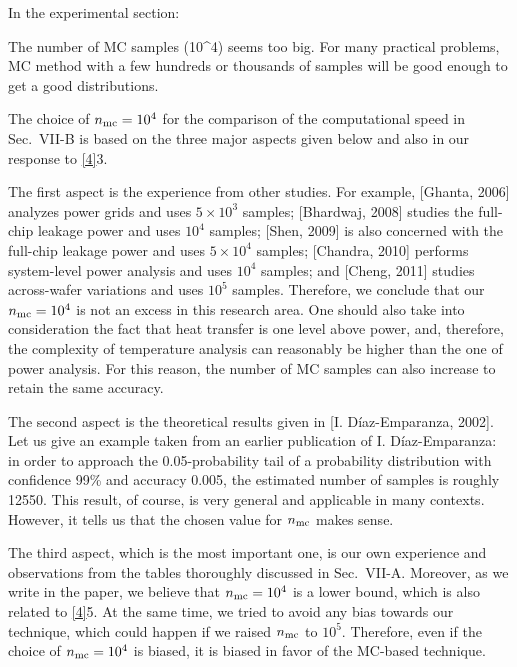 \begin{reviewer}
In the experimental section:

The number of MC samples (10\^{}4) seems too big. For many practical problems, MC method with a few hundreds or thousands of samples will be good enough to get a good distributions.
\end{reviewer}
\begin{authors}
The choice of ${n_\text{mc}} = 10^4$ for the comparison of the computational speed in Sec.~VII-B is based on the three major aspects given below and also in our response to \cref{4}{3}.

The first aspect is the experience from other studies.
For example, [Ghanta, 2006] analyzes power grids and uses $5 \times 10^3$ samples; [Bhardwaj, 2008] studies the full-chip leakage power and uses $10^4$ samples; [Shen, 2009] is also concerned with the full-chip leakage power and uses $5 \times 10^4$ samples; [Chandra, 2010] performs system-level power analysis and uses $10^4$ samples; and [Cheng, 2011] studies across-wafer variations and uses $10^5$ samples.
Therefore, we conclude that our ${n_\text{mc}} = 10^4$ is not an excess in this research area.
One should also take into consideration the fact that heat transfer is one level above power, and, therefore, the complexity of temperature analysis can reasonably be higher than the one of power analysis.
For this reason, the number of MC samples can also increase to retain the same accuracy.

The second aspect is the theoretical results given in [I. D\'{i}az-Emparanza, 2002].
Let us give an example taken from an earlier publication of I. D\'{i}az-Emparanza: in order to approach the 0.05-probability tail of a probability distribution with confidence 99\% and accuracy 0.005, the estimated number of samples is roughly 12550.
This result, of course, is very general and applicable in many contexts.
However, it tells us that the chosen value for ${n_\text{mc}}$ makes sense.

The third aspect, which is the most important one, is our own experience and observations from the tables thoroughly discussed in Sec.~VII-A.
Moreover, as we write in the paper, we believe that ${n_\text{mc}} = 10^4$ is a lower bound, which is also related to \cref{4}{5}.
At the same time, we tried to avoid any bias towards our technique, which could happen if we raised ${n_\text{mc}}$ to $10^5$.
Therefore, even if the choice of ${n_\text{mc}} = 10^4$ is biased, it is biased in favor of the MC-based technique.


\end{authors}
